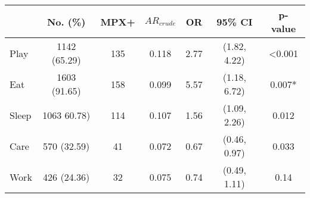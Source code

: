 \begin{tabular}{lcccccc}
\centering
\toprule
 \textbf{& No. (\%)} & \textbf{MPX+} & \textbf{$AR_{crude}$} & \textbf{OR} & \textbf{95\% CI} & \textbf{p-value} \\
\midrule
Play & 1142 (65.29) & 135 & 0.118 & 2.77 & (1.82, 4.22) & \textless0.001 \\
Eat & 1603 (91.65) & 158 & 0.099 & 5.57 & (1.18, 6.72) & 0.007* \\
Sleep & 1063 60.78) & 114 & 0.107 & 1.56 & (1.09, 2.26) & 0.012 \\
Care & 570 (32.59) & 41 & 0.072 & 0.67 & (0.46, 0.97) & 0.033 \\
Work & 426 (24.36) & 32 & 0.075 & 0.74 & (0.49, 1.11) & 0.14 \\

\bottomrule
\end{tabular}